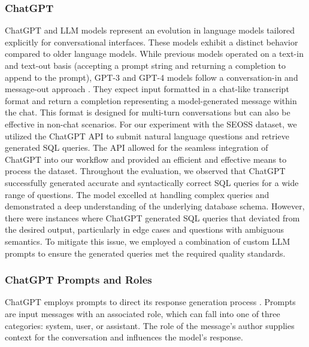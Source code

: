 \subsubsection{ChatGPT}

ChatGPT and LLM models represent an evolution in language models tailored explicitly for conversational interfaces. These models exhibit a distinct behavior compared to older language models. While previous models operated on a text-in and text-out basis (accepting a prompt string and returning a completion to append to the prompt), GPT-3 and GPT-4 models follow a conversation-in and message-out approach \cite{bubeck2023sparks}. They expect input formatted in a chat-like transcript format and return a completion representing a model-generated message within the chat. This format is designed for multi-turn conversations but can also be effective in non-chat scenarios.
For our experiment with the SEOSS dataset, we utilized the ChatGPT API to submit natural language questions and retrieve generated SQL queries. The API allowed for the seamless integration of ChatGPT into our workflow and provided an efficient and effective means to process the dataset.
Throughout the evaluation, we observed that ChatGPT successfully generated accurate and syntactically correct SQL queries for a wide range of questions. The model excelled at handling complex queries and demonstrated a deep understanding of the underlying database schema.
However, there were instances where ChatGPT generated SQL queries that deviated from the desired output, particularly in edge cases and questions with ambiguous semantics. To mitigate this issue, we employed a combination of custom LLM prompts to ensure the generated queries met the required quality standards.

\subsubsection{ChatGPT Prompts and Roles}

ChatGPT employs prompts to direct its response generation process \cite{white2023prompt}. Prompts are input messages with an associated role, which can fall into one of three categories: system, user, or assistant. The role of the message's author supplies context for the conversation and influences the model's response. \cite{openai2023gpt4}

